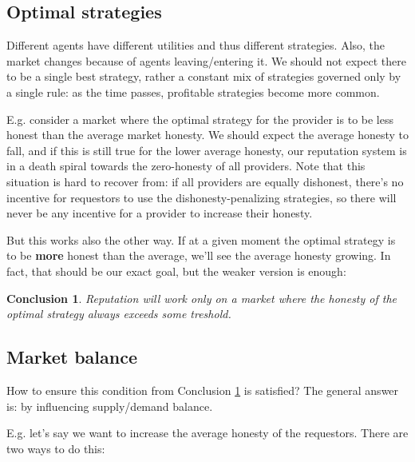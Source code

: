\documentclass{article}
\newtheorem{conclusion}{Conclusion}[section]
\begin{document}
\subsection{Optimal strategies}

Different agents have different utilities and thus different strategies. 
Also, the market changes because of agents leaving/entering it. We should not expect there to be a single best strategy,
rather a constant mix of strategies governed only by a single rule: as the time passes, profitable strategies become more common.

E.g. consider a market where the optimal strategy for the provider is to be less honest than the average market honesty.
We should expect the average honesty to fall, and if this is still true for the lower average honesty, our reputation system is in a death spiral towards
the zero-honesty of all providers. Note that this situation is hard to recover from: if all providers are equally dishonest, there's no incentive for requestors
to use the dishonesty-penalizing strategies, so there will never be any incentive for a provider to increase their honesty.

But this works also the other way. If at a given moment the optimal strategy is to be \textbf{more} honest than the average, 
we'll see the average honesty growing. In fact, that should be our exact goal, but the weaker version is enough:

\begin{conclusion}
Reputation will work only on a market where the honesty of the optimal strategy always exceeds some treshold.
\label{required honesty level}
\end{conclusion}

\subsection{Market balance}
How to ensure this condition from Conclusion \ref{required honesty level} is satisfied? The general answer is: by influencing supply/demand balance.

E.g. let's say we want to increase the average honesty of the requestors. There are two ways to do this:
\end{document}
